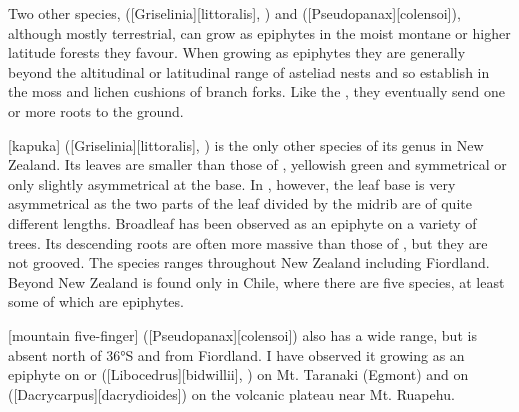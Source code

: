 Two other species,  ([Griselinia][littoralis], ) and  ([Pseudopanax][colensoi]), although mostly terrestrial, can grow as epiphytes in the moist montane or higher latitude forests they favour.
When growing as epiphytes they are generally beyond the altitudinal or latitudinal range of asteliad nests and so establish in the moss and lichen cushions of branch forks.
Like the , they eventually send one or more roots to the ground.

[kapuka] ([Griselinia][littoralis], ) is the only other species of its genus in New Zealand.
Its leaves are smaller than those of , yellowish green and symmetrical or only slightly asymmetrical at the base.
In , however, the leaf base is very asymmetrical as the two parts of the leaf divided by the midrib are of quite different lengths.
Broadleaf has been observed as an epiphyte on a variety of trees.
Its descending roots are often more massive than those of , but they are not grooved.
The species ranges throughout New Zealand including Fiordland.
Beyond New Zealand  is found only in Chile, where there are five species, at least some of which are epiphytes.

[mountain five-finger] ([Pseudopanax][colensoi]) also has a wide range, but is absent north of \ang{36}S and from Fiordland.
I have observed it growing as an epiphyte on  or  ([Libocedrus][bidwillii], ) on Mt. Taranaki (Egmont) and on  ([Dacrycarpus][dacrydioides]) on the volcanic plateau near Mt. Ruapehu.

